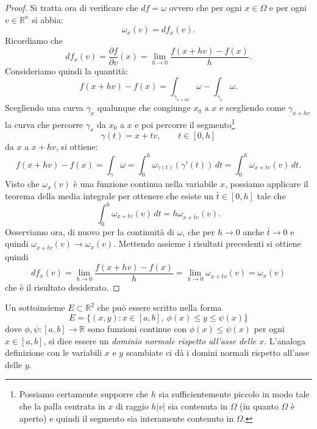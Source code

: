 \documentclass[italian,a4paper]{scrartcl}
\newcommand{\RR}{{\mathbb R}}
\begin{document}
\begin{proof}
Si tratta ora di verificare che $df = \omega$ ovvero che per ogni
$x\in \Omega$ e per ogni $v\in \RR^n$ si abbia:
\[
   \omega_x(v) = df_x(v).
\]
Ricordiamo che
\[
df_x(v) = \frac{\partial f}{\partial v}(x) = \lim_{h\to 0}
\frac{f(x+hv) - f(x)}{h}.
\]
Consideriamo quindi la quantità:
\[
 f(x+hv)-f(x) = \int_{\gamma_{x+hv}} \omega - \int_{\gamma_x} \omega.
\]
Scegliendo una curva $\gamma_x$ qualunque che congiunge $x_0$ a $x$ e
scegliendo come $\gamma_{x+hv}$ la curva che percorre $\gamma_x$ da
$x_0$ a $x$ e poi percorre il segmento\footnote{Possiamo certamente
  supporre che $h$ sia sufficientemente piccolo in modo tale che la
  palla centrata in $x$ di raggio $h|v|$ sia contenuta in $\Omega$ (in
quanto $\Omega$ è aperto) e quindi il segmento sia interamente
contenuto in $\Omega$.}
\[
  \gamma(t) = x + t v,\qquad t\in[0,h]
\]
da $x$ a $x+hv$, si ottiene:
\[
f(x+hv)-f(x) = \int_\gamma \omega = \int_0^h
\omega_{\gamma(t)}(\gamma'(t))\, dt
= \int_0^h \omega_{x+tv}(v)\, dt.
\]
Visto che $\omega_x(v)$ è una funzione continua nella variabile $x$,
possiamo applicare il teorema della media integrale per ottenere che
esiste un $\bar t \in [0,h]$ tale che
\[
\int_0^h \omega_{x+tv}(v)\, dt = h \omega_{x+\bar t v}(v).
\]
Osserviamo ora, di nuovo per la continuità di $\omega$, che per $h\to
0$ anche $\bar t \to 0$ e quindi $\omega_{x+\bar t v}(v) \to
\omega_x(v)$.
Mettendo assieme i risultati precedenti si ottiene quindi
\[
df_x(v) = \lim_{h\to 0}\frac{f(x+hv)-f(x)}{h} = \lim_{h\to 0}
\omega_{x+\bar tv}(v) = \omega_x(v)
\]
che è il risultato desiderato.
\end{proof}

Un sottoinsieme $E\subset \RR^2$ che può essere scritto nella forma
\[
  E = \{(x,y)\colon x\in [a,b],\ \phi(x) \le y \le \psi(x)\}
\]
dove $\phi,\psi\colon [a,b]\to \RR$ sono funzioni continue con $\phi(x)\le \psi(x)$ per ogni $x\in [a,b]$,
si dice essere un \emph{dominio normale rispetto all'asse delle
  $x$}. L'analoga definizione con le variabili $x$ e $y$ scambiate
ci dà i domini normali rispetto all'asse delle $y$.
\end{document}

